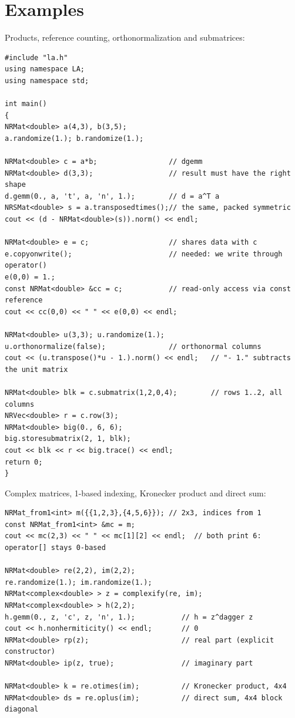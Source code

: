 \section{Examples}\label{sec:mat:examples}
Products, reference counting, orthonormalization and submatrices:
\begin{lstlisting}
#include "la.h"
using namespace LA;
using namespace std;

int main()
{
NRMat<double> a(4,3), b(3,5);
a.randomize(1.); b.randomize(1.);

NRMat<double> c = a*b;                 // dgemm
NRMat<double> d(3,3);                  // result must have the right shape
d.gemm(0., a, 't', a, 'n', 1.);        // d = a^T a
NRSMat<double> s = a.transposedtimes();// the same, packed symmetric
cout << (d - NRMat<double>(s)).norm() << endl;

NRMat<double> e = c;                   // shares data with c
e.copyonwrite();                       // needed: we write through operator()
e(0,0) = 1.;
const NRMat<double> &cc = c;           // read-only access via const reference
cout << cc(0,0) << " " << e(0,0) << endl;

NRMat<double> u(3,3); u.randomize(1.);
u.orthonormalize(false);               // orthonormal columns
cout << (u.transpose()*u - 1.).norm() << endl;   // "- 1." subtracts the unit matrix

NRMat<double> blk = c.submatrix(1,2,0,4);        // rows 1..2, all columns
NRVec<double> r = c.row(3);
NRMat<double> big(0., 6, 6);
big.storesubmatrix(2, 1, blk);
cout << blk << r << big.trace() << endl;
return 0;
}
\end{lstlisting}

Complex matrices, 1-based indexing, Kronecker product and direct sum:
\begin{lstlisting}
NRMat_from1<int> m({{1,2,3},{4,5,6}}); // 2x3, indices from 1
const NRMat_from1<int> &mc = m;
cout << mc(2,3) << " " << mc[1][2] << endl;  // both print 6: operator[] stays 0-based

NRMat<double> re(2,2), im(2,2);
re.randomize(1.); im.randomize(1.);
NRMat<complex<double> > z = complexify(re, im);
NRMat<complex<double> > h(2,2);
h.gemm(0., z, 'c', z, 'n', 1.);           // h = z^dagger z
cout << h.nonhermiticity() << endl;       // 0
NRMat<double> rp(z);                      // real part (explicit constructor)
NRMat<double> ip(z, true);                // imaginary part

NRMat<double> k = re.otimes(im);          // Kronecker product, 4x4
NRMat<double> ds = re.oplus(im);          // direct sum, 4x4 block diagonal
\end{lstlisting}

